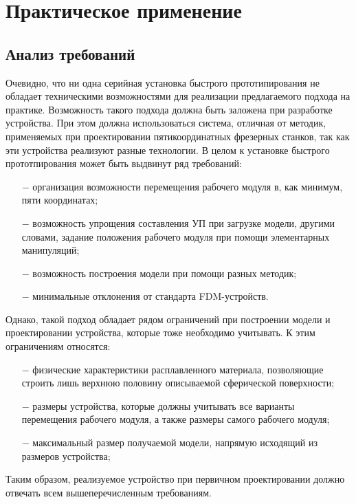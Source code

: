 \chapter{Практическое применение}
\section {Анализ требований}

Очевидно, что ни одна серийная установка быстрого прототипирования не обладает техническими возможностями для реализации предлагаемого подхода на практике. Возможность такого подхода должна быть заложена при разработке устройства. При этом должна использоваться система, отличная от методик, применяемых при проектировании пятикоординатных фрезерных станков, так как эти устройства реализуют разные технологии. В целом к установке быстрого прототпирования может быть выдвинут ряд требований:

\begin{itemize}
\item[$-$] организация возможности перемещения рабочего модуля в, как минимум, пяти координатах;
\item[$-$] возможность упрощения составления УП при загрузке модели, другими словами, задание положения рабочего модуля при помощи элементарных манипуляций;
\item[$-$] возможность построения модели при помощи разных методик;
\item[$-$] минимальные отклонения от стандарта FDM-устройств.
\end{itemize}

Однако, такой подход обладает рядом ограничений при построении модели и проектировании устройства, которые тоже необходимо учитывать. К этим ограничениям относятся:

\begin{itemize}
\item[$-$] физические характеристики расплавленного материала, позволяющие строить лишь верхнюю половину описываемой сферической поверхности;
\item[$-$] размеры устройства, которые должны учитывать все варианты перемещения рабочего модуля, а также размеры самого рабочего модуля;
\item[$-$] максимальный размер получаемой модели, напрямую исходящий из размеров устройства;
\end{itemize}

Таким образом, реализуемое устройство при первичном проектировании должно отвечать всем вышеперечисленным требованиям.

